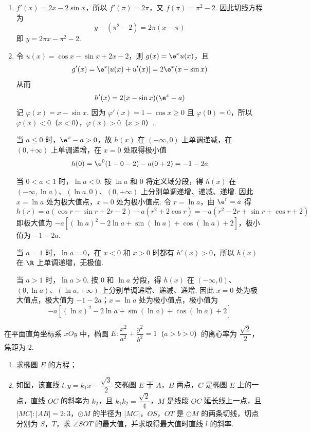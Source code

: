 \begin{solution}
\begin{enumerate}
\item \(f'(x)=2x-2\sin x\)，所以 \(f'(\pi)=2\pi\)，又 \(f(\pi)=\pi^2-2\). 因此切线方程为
\[
y-(\pi^2-2)=2\pi(x-\pi)
\]
即 \(y=2\pi x-\pi^2-2\).
\item 令 \(u(x)=\cos x-\sin x+2x-2\)，则 \(g(x)=\e^xu(x)\)，且
\[
g'(x)=\e^x[u(x)+u'(x)]=2\e^x(x-\sin x)
\]
从而
\[
h'(x)=2(x-\sin x)(\e^x-a)
\]
记 \(\varphi(x)=x-\sin x\). 因为 \(\varphi'(x)=1-\cos x\geq0\) 且 \(\varphi(0)=0\)，所以 \(\varphi(x)<0\)（\(x<0\)），\(\varphi(x)>0\)（\(x>0\)）.

当 \(a\leq0\) 时，\(\e^x-a>0\)，故 \(h(x)\) 在 \((-\infty,0)\) 上单调递减，在 \((0,+\infty)\) 上单调递增，在 \(x=0\) 处取得极小值
\[
h(0)=\e^0(1-0-2)-a(0+2)=-1-2a
\]

当 \(0<a<1\) 时，\(\ln a<0\). 按 \(\ln a\) 和 \(0\) 将定义域分段，得 \(h(x)\) 在 \((-\infty,\ln a)\)、\((\ln a,0)\)、\((0,+\infty)\) 上分别单调递增、递减、递增. 因此 \(x=\ln a\) 处为极大值点，\(x=0\) 处为极小值点. 令 \(r=\ln a\)，由 \(\e^r=a\) 得
\[
h(r)=a(\cos r-\sin r+2r-2)-a(r^2+2\cos r)
=-a\left(r^2-2r+\sin r+\cos r+2\right)
\]
即极大值为 \(-a\left[(\ln a)^2-2\ln a+\sin(\ln a)+\cos(\ln a)+2\right]\)，极小值为 \(-1-2a\).

当 \(a=1\) 时，\(\ln a=0\)，在 \(x<0\) 和 \(x>0\) 时都有 \(h'(x)>0\)，所以 \(h(x)\) 在 \(\R\) 上单调递增，无极值.

当 \(a>1\) 时，\(\ln a>0\). 按 \(0\) 和 \(\ln a\) 分段，得 \(h(x)\) 在 \((-\infty,0)\)、\((0,\ln a)\)、\((\ln a,+\infty)\) 上分别单调递增、递减、递增. 因此 \(x=0\) 处为极大值点，极大值为 \(-1-2a\)；\(x=\ln a\) 处为极小值点，极小值为
\[
-a\left[(\ln a)^2-2\ln a+\sin(\ln a)+\cos(\ln a)+2\right]
\]
\end{enumerate}
\end{solution}

\begin{problem}
在平面直角坐标系 \(xOy\) 中，椭圆 \(E:\dfrac{x^2}{a^2}+\dfrac{y^2}{b^2}=1\)（\(a>b>0\)）的离心率为 \(\dfrac{\sqrt2}{2}\)，焦距为 2.

\begin{enumerate}
\item 求椭圆 \(E\) 的方程；
\item 如图，该直线 \(l:y=k_1x-\dfrac{\sqrt3}{2}\) 交椭圆 \(E\) 于 \(A\)，\(B\) 两点，\(C\) 是椭圆 \(E\) 上的一点，直线 \(OC\) 的斜率为 \(k_2\)，且 \(k_1k_2=\dfrac{\sqrt2}{4}\)，\(M\) 是线段 \(OC\) 延长线上一点，且 \(\lvert MC\rvert:\lvert AB\rvert=2:3\)，\(\odot M\) 的半径为 \(\lvert MC\rvert\)，\(OS\)，\(OT\) 是 \(\odot M\) 的两条切线，切点分别为 \(S\)，\(T\)，求 \(\angle SOT\) 的最大值，并求取得最大值时直线 \(l\) 的斜率.
\end{enumerate}

\end{problem}

